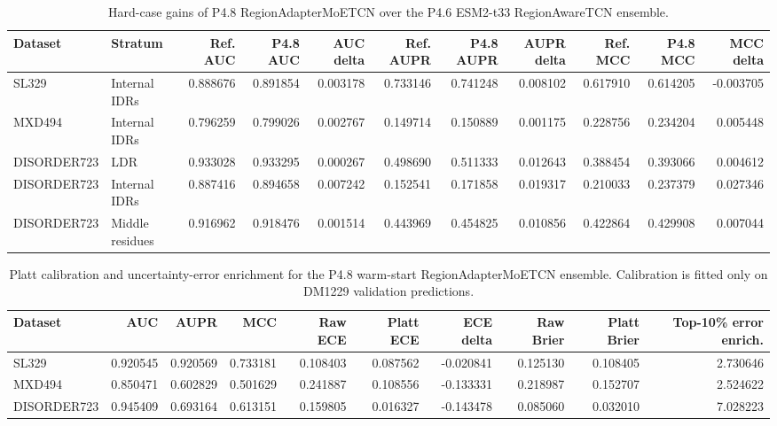 \documentclass[namedate,webpdf,traditional,large]{oup-authoring-template}
\newcommand{\method}{RegionAdapterMoETCN}
\newcommand{\backbone}{RegionAwareTCN}
\begin{document}
\begin{table}[!t]
\centering
\caption{Hard-case gains of P4.8 \method{} over the P4.6 ESM2-t33 \backbone{} ensemble.}
\label{tab:hardcase}
\scriptsize
\setlength{\tabcolsep}{3pt}
\begin{tabular}{llrrrrrrrrr}
\toprule
Dataset & Stratum & Ref. AUC & P4.8 AUC & AUC delta & Ref. AUPR & P4.8 AUPR & AUPR delta & Ref. MCC & P4.8 MCC & MCC delta \\
\midrule
SL329 & Internal IDRs & 0.888676 & 0.891854 & 0.003178 & 0.733146 & 0.741248 & 0.008102 & 0.617910 & 0.614205 & -0.003705 \\
MXD494 & Internal IDRs & 0.796259 & 0.799026 & 0.002767 & 0.149714 & 0.150889 & 0.001175 & 0.228756 & 0.234204 & 0.005448 \\
DISORDER723 & LDR & 0.933028 & 0.933295 & 0.000267 & 0.498690 & 0.511333 & 0.012643 & 0.388454 & 0.393066 & 0.004612 \\
DISORDER723 & Internal IDRs & 0.887416 & 0.894658 & 0.007242 & 0.152541 & 0.171858 & 0.019317 & 0.210033 & 0.237379 & 0.027346 \\
DISORDER723 & Middle residues & 0.916962 & 0.918476 & 0.001514 & 0.443969 & 0.454825 & 0.010856 & 0.422864 & 0.429908 & 0.007044 \\
\bottomrule
\end{tabular}
\end{table}

\begin{table}[!t]
\centering
\caption{Platt calibration and uncertainty-error enrichment for the P4.8 warm-start \method{} ensemble. Calibration is fitted only on DM1229 validation predictions.}
\label{tab:calibration}
\scriptsize
\setlength{\tabcolsep}{4pt}
\begin{tabular}{lrrrrrrrrr}
\toprule
Dataset & AUC & AUPR & MCC & Raw ECE & Platt ECE & ECE delta & Raw Brier & Platt Brier & Top-10\% error enrich. \\
\midrule
SL329 & 0.920545 & 0.920569 & 0.733181 & 0.108403 & 0.087562 & -0.020841 & 0.125130 & 0.108405 & 2.730646 \\
MXD494 & 0.850471 & 0.602829 & 0.501629 & 0.241887 & 0.108556 & -0.133331 & 0.218987 & 0.152707 & 2.524622 \\
DISORDER723 & 0.945409 & 0.693164 & 0.613151 & 0.159805 & 0.016327 & -0.143478 & 0.085060 & 0.032010 & 7.028223 \\
\bottomrule
\end{tabular}
\end{table}



\end{document}
